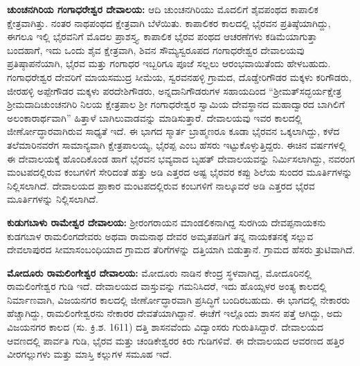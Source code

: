 \textbf{ಚುಂಚನಗಿರಿಯ ಗಂಗಾಧರೇಶ್ವರ ದೇವಾಲಯ:} ಆದಿ ಚುಂಚನಗಿರಿಯು ಮೊದಲಿಗೆ ಶೈವಪಂಥದ ಕಾಪಾಲಿಕ ಕ್ಷೇತ್ರವಾಗಿತ್ತು. ನಂತರ ನಾಥಪಂಥದ ಕ್ಷೇತ್ರವಾಗಿ ಬೆಳೆಯಿತು. ಕಾಪಾಲಿಕರ ಕಾಲದಲ್ಲಿ ಭೈರವನ ಪ್ರತಿಷ್ಠೆಯಾಗಿದ್ದು, ಈಗಲೂ ಇಲ್ಲಿ ಭೈರವನಿಗೆ ಮೊದಲ ಪ್ರಾಶಸ್ತ್ಯ. ಕಾಪಾಲಿಕ ಭೈರವ ಪಂಥದ ಆಚರಣೆಗಳು ಕಡಿಮೆಯಾಗುತ್ತಾ ಬಂದಹಾಗೆ, ಇದು ಒಂದು ಶೈವ ಕ್ಷೇತ್ರವಾಗಿ, ಶಿವನ ಸೌಮ್ಯಸ್ವರೂಪದ ಗಂಗಾಧರೇಶ್ವರ ದೇವಾಲಯವು ಪ್ರತಿಷ್ಠಾಪನೆಯಾಗಿ, ಭೈರವ ಮತ್ತು ಗಂಗಾಧರ ಇಬ್ಬರಿಗೂ ಪೂಜೆ ಸಲ್ಲಲು ಆರಂಭವಾಯಿತೆಂದು ಹೇಳಬಹುದು. ಗಂಗಾಧರೇಶ್ವರ ದೇವರಿಗೆ ಮಾಯಸಮುದ್ರ ಸೀಮೆಯ, ಸ್ವರವನಹಳ್ಳಿ ಗ್ರಾಮದ, ದೊಡ್ಡೇರಿಗೌಡರ ಮಕ್ಕಳು ಕರಿಗೌಡರು, ಜೀರಹಳ್ಳಿ ಅಪ್ಪೇಗೌಡರ ಮಕ್ಕಳು ಪರದೇಶಿಗೌಡರು, ಅನ್ನದಾನಿಗೌಡರುಗಳ ಸಹಾಯದಿಂದ “ಶ‍್ರೀಮತ್​ಸದ್ಭರ್ಯಕ್ಷೇತ್ರ ಶ‍್ರೀಮದಾದಿಚುಂಚನಗಿರಿ ನಿಲಯ ಕ್ಷೇತ್ರಪಾಲ ಶ‍್ರೀ ಗಂಗಾಧರೇಶ್ವರ ಸ್ವಾಮಿಯ ದೇವಸ್ಥಾನದ ಮಹಾದ್ವಾರದ ಬಾಗಿಲಿಗೆ ಅಲಂಕಾರಾರ್ಥವಾಗಿ” ಹಿತ್ತಾಳೆ ಬಾಗಿಲುವಾಡವನ್ನು ಮಾಡಿಸುತ್ತಾರೆ. ದೇವಾಲಯವು ಇವರ ಕಾಲದಲ್ಲಿ ಜೀರ್ಣೋದ್ಧಾರವಾಗಿರುವ ಸಾಧ್ಯತೆ ಇದೆ. ಈ ಭಾಗದ ಸ್ಮಾರ್ತ ಬ್ರಾಹ್ಮಣರೂ ಕೂಡಾ ಭೈರವನ ಒಕ್ಕಲಾಗಿದ್ದು, ಕಳೆದ ತಲೆಮಾರಿನವರೆಗ ಸಾಮಾನ್ಯವಾಗಿ ಕ್ಷೇತ್ರಪಾಲಯ್ಯ, ಭೈರಪ್ಪ ಎಂಬ ಹೆಸರು ಇಟ್ಟುಕೊಳ್ಳುತ್ತಿದ್ದರು. ಈಚಿನ ವರ್ಷಗಳಲ್ಲಿ ಈ ದೇವಾಲಯಕ್ಕೆ ಹೊಂದಿಕೊಂಡ ಹಾಗೆ ಭೈರವನ ಭವ್ಯವಾದ ಬೃಹತ್ ದೇವಾಲಯವನ್ನು ನಿರ್ಮಿಸಲಾಗಿದ್ದು, ನವರಂಗ ಮಂಟಪದಲ್ಲಿರುವ ಕಂಬಗಳಿಗೆ ಸೇರಿದಂತೆ ಹತ್ತು ಅಡಿ ಎತ್ತರದ ಅಷ್ಟ ಭೈರವರ ಕಪ್ಪು ಶಿಲೆಯ ಸುಂದರ ಮೂರ್ತಿಗಳನ್ನು ನಿಲ್ಲಿಸಲಾಗಿದೆ. ದೇವಾಲಯದ ಪ್ರಾಕಾರ ಮಂಟಪದಲ್ಲಿರುವ ಕಂಬಗಳಿಗೆ ನಾಲ್ಕೂವರೆ ಅಡಿ ಎತ್ತರದ  ಭೈರವ ಮೂರ್ತಿಗಳನ್ನು ನಿಲ್ಲಿಸಲಾಗಿದೆ.

\textbf{ಕುಡುಗಬಾಳು ರಾಮೇಶ್ವರ ದೇವಾಲಯ:} ಶ‍್ರೀರಂಗರಾಯನ ಮಾಂಡಲಿಕನಾಗಿದ್ದ ಸುರಗಿಯ ದೇವಪ್ಪನಾಯಕನು ಕುಡಗಬಾಳ ರಾಮಲಿಂಗದೇವರು ಅಥವಾ ರಾಮನಾಥ ದೇವರ ಅಮೃತಪಡಿಗೆ ತನ್ನ ನಾಯಕತನಕ್ಕೆ ಸಲ್ಲುವ ದೇವಲಾಪುರದ ಸೀಮಾಸಂಬಂಧಿಯಾದ ಗ್ರಾಮದ ತೆರಿಗೆಗಳನ್ನು ದತ್ತಿಯಾಗಿ ಬಿಡುತ್ತಾನೆ. ಗ್ರಾಮದ ಹೆಸರು ತ್ರುಟಿವಾಗಿದೆ.

\textbf{ಮೋದೂರು ರಾಮಲಿಂಗೇಶ್ವರ ದೇವಾಲಯ:} ಮೋದೂರು ನಾಡಿನ ಕೇಂದ್ರ ಸ್ಥಳವಾಗಿದ್ದ, ಮೋದೂರಿನಲ್ಲಿ ರಾಮಲಿಂಗೇಶ್ವರ ಗುಡಿ ಇದೆ. ದೇವಾಲಯದ ವಾಸ್ತುವನ್ನು ಗಮನಿಸಿದರೆ, ಇದು ಹೊಯ್ಸಳರ ಅಂತ್ಯ ಕಾಲದಲ್ಲಿ ನಿರ್ಮಾಣವಾಗಿ, ವಿಜಯನಗರ ಕಾಲದಲ್ಲಿ ಜೀರ್ಣೋದ್ಧಾರವಾಗಿ ಪ್ರಸಿದ್ಧಿಗೆ ಬಂದಿರಬಹುದು. ಈ ಭಾಗದಲ್ಲಿ ನೇಕಾರರು ಹೆಚ್ಚಾಗಿದ್ದು, ರಾಮಲಿಂಗೇಶ್ವರನು ನೇಕಾರರ ದೇವತೆಯಾಗಿದ್ದಾನೆ. ಈಚೆಗೆ ಇಲ್ಲೊಂದು ಶಾಸನ ಪತ್ತೆ ಆಗಿದ್ದು, ಅದು ವಿಜಯನಗರ ಕಾಲದ (ಸು. ಕ್ರಿ.ಶ. 1611) ದತ್ತಿ ಶಾಸನವೆಂದು ವಿದ್ವಾಂಸರು ಗುರುತಿಸಿದ್ದಾರೆ. ದೇವಾಲಯದ ಆವಣದಲ್ಲಿ ಪಾರ್ವತಿ ಗುಡಿ, ಭೈರವ ಮತ್ತು ಚಂಡಿಕೇಶ್ವರರ ಕಿರು ಗುಡಿಗಳಿವೆ. ಈ ದೇವಾಲಯದ ಆವರಣದ ಹತ್ತಿರ ವೀರಗಲ್ಲುಗಳು ಮತ್ತು ಮಾಸ್ತಿ ಕಲ್ಲುಗಳ ಸಮೂಹ ಇದೆ.

